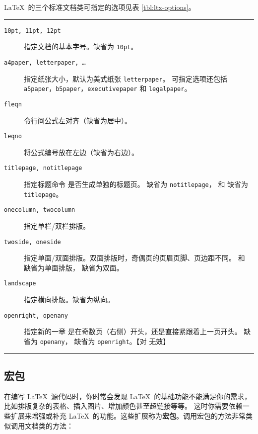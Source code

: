 \LaTeX\ 的三个标准文档类可指定的选项见表 \ref{tbl:ltx-options}。

\begin{table}[htp]
\caption{\LaTeX\ 的三个标准文档类可指定的选项。}\label{tbl:ltx-options}
\hrule
\begin{description}
\item[\texttt{10pt, 11pt, 12pt}] \quad 指定文档的基本字号。缺省为 \texttt{10pt}。

\item[\texttt{a4paper, letterpaper, \ldots}] \quad 指定纸张大小，默认为美式纸张 \texttt{letterpaper}。
可指定选项还包括 \texttt{a5paper}，\texttt{b5paper}，\texttt{executivepaper} 和 \texttt{legalpaper}。

\item[\texttt{fleqn}] \quad 令行间公式左对齐（缺省为居中）。

\item[\texttt{leqno}] \quad 将公式编号放在左边（缺省为右边）。

\item[\texttt{titlepage, notitlepage}] 指定标题命令  是否生成单独的标题页。
 缺省为 \texttt{notitlepage}， 和  缺省为 \texttt{titlepage}。

\item[\texttt{onecolumn, twocolumn}] \quad 指定单栏/双栏排版。

\item[\texttt{twoside, oneside}] \quad 指定单面/双面排版。双面排版时，奇偶页的页眉页脚、页边距不同。
 和  缺省为单面排版， 缺省为双面。

\item[\texttt{landscape}] \quad 指定横向排版。缺省为纵向。

\item[\texttt{openright, openany}] \quad 指定新的一章  是在奇数页（右侧）开头，还是直接紧跟着上一页开头。
 缺省为 \texttt{openany}， 缺省为 \texttt{openright}。【对  无效】
\end{description}
\hrule
\end{table}

\subsection{宏包}\label{subsec:packages}

在编写 \LaTeX\ 源代码时，你时常会发现 \LaTeX\ 的基础功能不能满足你的需求，比如排版复杂的表格、插入图片、增加颜色甚至超链接等等。
这时你需要依赖一些扩展来增强或补充 \LaTeX\ 的功能。这些扩展称为\textbf{宏包}。调用宏包的方法非常类似调用文档类的方法：
\begin{command}
\end{command}


